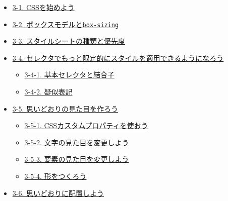 \begin{itemize}
\begin{itemize}
    \begin{itemize}
    \tightlist
    \item
      \hyperref[3-1-cssux3092ux59cbux3081ux3088ux3046]{3-1.
      CSSを始めよう}
    \item
      \hyperref[3-2-ux30dcux30c3ux30afux30b9ux30e2ux30c7ux30ebux3068box-sizing]{3-2.
      ボックスモデルと\texttt{box-sizing}}
    \item
      \hyperref[3-3-ux30b9ux30bfux30a4ux30ebux30b7ux30fcux30c8ux306eux7a2eux985eux3068ux512aux5148ux5ea6]{3-3.
      スタイルシートの種類と優先度}
    \item
      \hyperref[3-4-ux30bbux30ecux30afux30bfux3067ux3082ux3063ux3068ux9650ux5b9aux7684ux306bux30b9ux30bfux30a4ux30ebux3092ux9069ux7528ux3067ux304dux308bux3088ux3046ux306bux306aux308dux3046]{3-4.
      セレクタでもっと限定的にスタイルを適用できるようになろう}

      \begin{itemize}
      \tightlist
      \item
        \hyperref[3-4-1-ux57faux672cux30bbux30ecux30afux30bfux3068ux7d50ux5408ux5b50]{3-4-1.
        基本セレクタと結合子}
      \item
        \hyperref[3-4-2-ux7591ux4f3cux8868ux8a18]{3-4-2. 疑似表記}
      \end{itemize}
    \item
      \hyperref[3-5-ux601dux3044ux3069ux304aux308aux306eux898bux305fux76eeux3092ux4f5cux308dux3046]{3-5.
      思いどおりの見た目を作ろう}

      \begin{itemize}
      \tightlist
      \item
        \hyperref[3-5-1-cssux30abux30b9ux30bfux30e0ux30d7ux30edux30d1ux30c6ux30a3ux3092ux4f7fux304aux3046]{3-5-1.
        CSSカスタムプロパティを使おう}
      \item
        \hyperref[3-5-2-ux6587ux5b57ux306eux898bux305fux76eeux3092ux5909ux66f4ux3057ux3088ux3046]{3-5-2.
        文字の見た目を変更しよう}
      \item
        \hyperref[3-5-3-ux8981ux7d20ux306eux898bux305fux76eeux3092ux5909ux66f4ux3057ux3088ux3046]{3-5-3.
        要素の見た目を変更しよう}
      \item
        \hyperref[3-5-4-ux5f62ux3092ux3064ux304fux308dux3046]{3-5-4.
        形をつくろう}
      \end{itemize}
    \item
      \hyperref[3-6-ux601dux3044ux3069ux304aux308aux306bux914dux7f6eux3057ux3088ux3046]{3-6.
      思いどおりに配置しよう}


\end{itemize}
\end{itemize}
\end{itemize}
